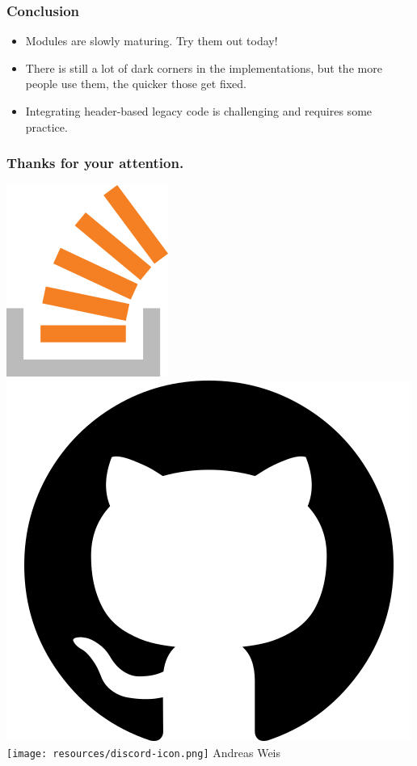\documentclass[aspectratio=169]{beamer}
\begin{document}
\begin{frame}
  \frametitle{Conclusion}
  
  \begin{itemize}
  \item Modules are slowly maturing. Try them out today!
  \item There is still a lot of dark corners in the implementations, but the more people use them, the quicker those get fixed.
  \item Integrating header-based legacy code is challenging and requires some practice.
  \end{itemize}
  
\end{frame}

\begin{frame}
  \frametitle{Thanks for your attention.}

  \href{https://stackoverflow.com/users/577603/comicsansms}{\includegraphics[height=.05\textheight]{resources/so-icon.png}}
  \href{https://github.com/ComicSansMS}{\includegraphics[height=.05\textheight]{resources/github-icon.png}}
  \texttt{[image: resources/discord-icon.png]} Andreas Weis
\end{frame}
\end{document}
